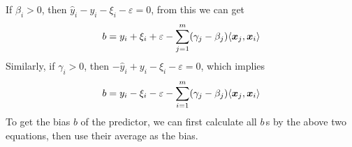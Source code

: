 If $\beta_i > 0$, then $\hat{y}_i - y_i -\xi_i - \varepsilon = 0$, from this we can get
\begin{equation}
    b = y_i + \xi_i + \varepsilon - \sum_{j=1}^m(\gamma_j-\beta_j)\langle\boldsymbol{x}_j, \boldsymbol{x}_i\rangle
\end{equation}
Similarly, if $\gamma_i > 0$, then $-\hat{y}_i + y_i -\xi_i - \varepsilon = 0$, which implies
\begin{equation}
    b = y_i - \xi_i - \varepsilon - \sum_{i=1}^m (\gamma_j - \beta_j)\langle\boldsymbol{x}_j, \boldsymbol{x}_i\rangle
\end{equation}
To get the bias $b$ of the predictor, we can first calculate all $b$\,s by the above two equations, then use
their average as the bias.